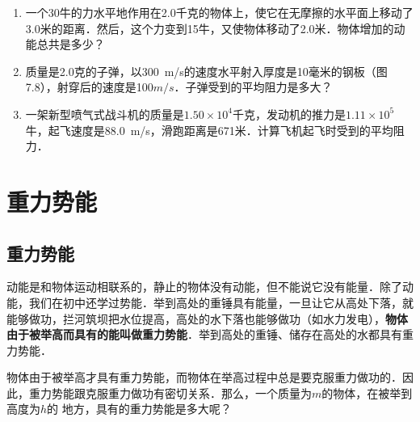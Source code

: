 \begin{enumerate}
    \item 一个30牛的力水平地作用在2.0千克的物体上，使它在无摩擦的水平面上移动了3.0米的距离．然后，这个力变到15牛，又使物体移动了2.0米．物体增加的动能总共是多少？
    \item 质量是2.0克的子弹，以\qty{300}{m/s}的速度水平射入厚度是10毫米的钢板（图7.8），射穿后的速度是100$\si{m/s}$．子弹受到的平均阻力是多大？

    \item 一架新型喷气式战斗机的质量是$1.50\times 10^4$千克，发动机的推力是$1.11\times 10^5$牛，起飞速度是\qty{88.0}{m/s}，滑跑距离是671米．计算飞机起飞时受到的平均阻力．
\end{enumerate}
\newpage
\section{重力势能}

\subsection{重力势能}

动能是和物体运动相联系的，静止的物体没有动能，但不能说它没有能量．除了动能，我们在初中还学过势能．举到高处的重锤具有能量，一旦让它从高处下落，就能够做功，拦河筑坝把水位提高，高处的水下落也能够做功（如水力发电），\textbf{物体由于被举高而具有的能叫做重力势能}．举到高处的重锤、储存在高处的水都具有重力势能．

物体由于被举高才具有重力势能，而物体在举高过程中总是要克服重力做功的．因此，重力势能跟克服重力做功有密切关系．那么，一个质量为$m$的物体，在被举到高度为$h$的
地方，具有的重力势能是多大呢？

